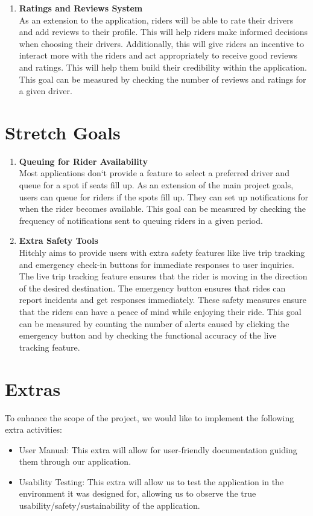 \documentclass{article}
\begin{document}
\begin{enumerate}
\item \textbf{Ratings and Reviews System} \\
As an extension to the application, riders will be able to rate their drivers and add reviews to their profile. This will help riders make informed decisions when choosing their drivers. Additionally, this will give riders an incentive to interact more with the riders and act appropriately to receive good reviews and ratings. This will help them build their credibility within the application. This goal can be measured by checking the number of reviews and ratings for a given driver. 
\end{enumerate}

\section{Stretch Goals}
\begin{enumerate}
\item \textbf{Queuing for Rider Availability}\\
Most applications don`t provide a feature to select a preferred driver and queue for a spot if seats fill up. As an extension of the main project goals, users can queue for riders if the spots fill up. They can set up notifications for when the rider becomes available. This goal can be measured by checking the frequency of notifications sent to queuing riders in a given period. 

\item \textbf{Extra Safety Tools}\\
Hitchly aims to provide users with extra safety features like live trip tracking and emergency check-in buttons for immediate responses to user inquiries. The live trip tracking feature ensures that the rider is moving in the direction of the desired destination. The emergency button ensures that rides can report incidents and get responses immediately. These safety measures ensure that the riders can have a peace of mind while enjoying their ride. This goal can be measured by counting the number of alerts caused by clicking the emergency button and by checking the functional accuracy of the live tracking feature. 
\end{enumerate}

\section{Extras} 

To enhance the scope of the project, we would like to implement the following extra
activities:
\begin{itemize}
\item User Manual: This extra will allow for user-friendly documentation guiding them 
through our application.
\item Usability Testing: This extra will allow us to test the application in the environment
it was designed for, allowing us to observe the true usability/safety/sustainability of the application.
\end{itemize}
\end{document}
